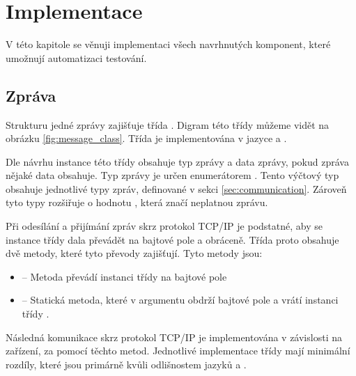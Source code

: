 \chapter{Implementace}\label{chap:implementation}

V této kapitole se věnuji implementaci všech navrhnutých komponent, které umožnují automatizaci testování.

\section{Zpráva}
Strukturu jedné zprávy zajišťuje třída . Digram této třídy můžeme vidět na obrázku \ref{fig:message_class}. Třída  je implementována v jazyce \csharp{} a \cpp{}.

Dle návrhu instance této třídy obsahuje typ zprávy a data zprávy, pokud zpráva nějaké data obsahuje. Typ zprávy je určen enumerátorem . Tento výčtový typ obsahuje jednotlivé typy zpráv, definované v sekci \ref{sec:communication}. Zároveň tyto typy rozšiřuje o hodnotu , která značí neplatnou zprávu.

Při odesílání a přijímání zpráv skrz protokol TCP/IP je podstatné, aby se instance třídy dala převádět na bajtové pole a obráceně. Třída  proto obsahuje dvě metody, které tyto převody zajišťují. Tyto metody jsou:

\begin{itemize}
    \item {} -- Metoda převádí instanci třídy  na bajtové pole
    \item {} -- Statická metoda, které v argumentu obdrží bajtové pole a vrátí instanci třídy .
\end{itemize}

Následná komunikace skrz protokol TCP/IP je implementována v závislosti na zařízení, za pomocí těchto metod. Jednotlivé implementace třídy  mají minimální rozdíly, které jsou primárně kvůli odlišnostem jazyků \csharp{} a \cpp{}.

